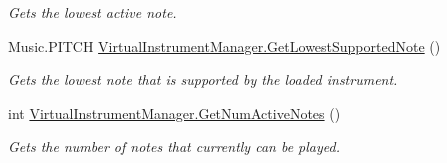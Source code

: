 \begin{DoxyCompactItemize}
\begin{DoxyCompactList}\small\item\em Gets the lowest active note. \end{DoxyCompactList}\item 
\mbox{\label{group___virtual_instrument_manager_event_types_gaeb152486450d6c6dc50078e1644c4c6a}} 
Music.\+P\+I\+T\+CH \hyperlink{group___virtual_instrument_manager_event_types_gaeb152486450d6c6dc50078e1644c4c6a}{Virtual\+Instrument\+Manager.\+Get\+Lowest\+Supported\+Note} ()
\begin{DoxyCompactList}\small\item\em Gets the lowest note that is supported by the loaded instrument. \end{DoxyCompactList}\item 
\mbox{\label{group___virtual_instrument_manager_event_types_ga3d6c823b1c1083eac8202f6c89e60b48}} 
int \hyperlink{group___virtual_instrument_manager_event_types_ga3d6c823b1c1083eac8202f6c89e60b48}{Virtual\+Instrument\+Manager.\+Get\+Num\+Active\+Notes} ()
\begin{DoxyCompactList}\small\item\em Gets the number of notes that currently can be played. \end{DoxyCompactList}\end{DoxyCompactItemize}
